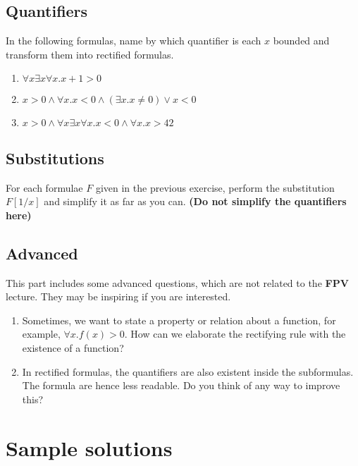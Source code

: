 \documentclass[12pt]{article}
\begin{document}
\subsection*{Quantifiers}
In the following formulas, name by which quantifier is each $x$ bounded and transform them into rectified formulas.
\begin{enumerate}
    \item $\forall x \exists x \forall x. x + 1 > 0$
    \item $x > 0 \land \forall x. x < 0 \land (\exists x. x \not=0) \lor x < 0$
    \item $x > 0 \land \forall x \exists x \forall x. x < 0 \land \forall x. x > 42$
\end{enumerate}
\subsection*{Substitutions}
For each formulae $F$ given in the previous exercise, perform the substitution $F[1/x]$ and 
simplify it as far as you can. \textbf{(Do not simplify the quantifiers here)}
\subsection*{Advanced}
This part includes some advanced questions, which are not related to the \textbf{FPV} lecture. They 
may be inspiring if you are interested.
\begin{enumerate}
    \item Sometimes, we want to state a property or relation about a function, for example, $\forall x. f(x) > 0$. How can we elaborate
    the rectifying rule with the existence of a function?
    \item In rectified formulas, the quantifiers are also existent inside the subformulas. The formula are 
    hence less readable. Do you think of any way to improve this?
\end{enumerate}

\newpage 
\section*{Sample solutions}
\end{document}
